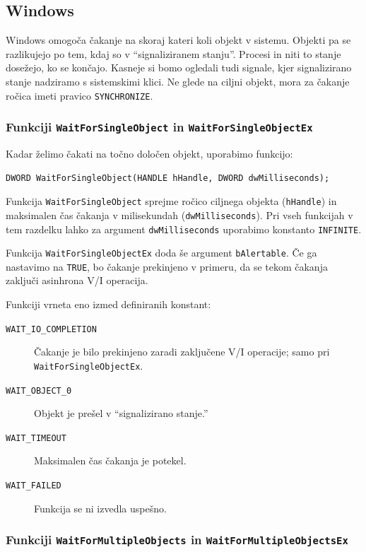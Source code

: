 \documentclass[a4paper,12pt,openright]{book}
\begin{document}
\subsection{Windows} \label{ssec:windows_syscalls:waiting}

Windows omogoča čakanje na skoraj kateri koli objekt v sistemu.
Objekti pa se razlikujejo po tem, kdaj so v ``signaliziranem stanju''.
Procesi in niti to stanje dosežejo, ko se končajo.
Kasneje si bomo ogledali tudi signale, kjer signalizirano stanje nadziramo s sistemskimi klici.
Ne glede na ciljni objekt, mora za čakanje ročica imeti pravico \texttt{SYNCHRONIZE}.

\subsubsection{Funkciji \texttt{WaitForSingleObject} in \texttt{WaitForSingleObjectEx}}

Kadar želimo čakati na točno določen objekt, uporabimo funkcijo:
\begin{lstlisting}[style=func]
 DWORD WaitForSingleObject(HANDLE hHandle, DWORD dwMilliseconds);
\end{lstlisting}

Funkcija \texttt{WaitForSingleObject} sprejme ročico ciljnega objekta (\texttt{hHan\-dle}) in maksimalen čas čakanja v milisekundah (\texttt{dwMilliseconds}).
Pri vseh funkcijah v tem razdelku lahko za argument \texttt{dwMilliseconds} uporabimo konstanto \texttt{INFINITE}.

Funkcija \texttt{WaitForSingleObjectEx} doda še argument \texttt{bAlertable}.
Če ga nastavimo na \texttt{TRUE}, bo čakanje prekinjeno v primeru, da se tekom čakanja zaključi asinhrona V/I operacija.

Funkciji vrneta eno izmed definiranih konstant:
\begin{description}
	\item[\texttt{WAIT\_IO\_COMPLETION}] Čakanje je bilo prekinjeno zaradi zaključene V/I operacije; samo pri \texttt{WaitForSingleObjectEx}.
	\item[\texttt{WAIT\_OBJECT\_0}] Objekt je prešel v ``signalizirano stanje.''
	\item[\texttt{WAIT\_TIMEOUT}] Maksimalen čas čakanja je potekel.
	\item[\texttt{WAIT\_FAILED}] Funkcija se ni izvedla uspešno.
\end{description}

\subsubsection{Funkciji \texttt{WaitForMultipleObjects} in \texttt{WaitForMultipleObjectsEx}}
\end{document}
